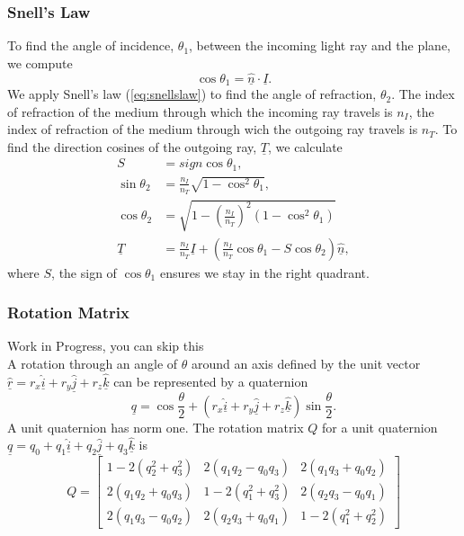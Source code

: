 \documentclass{article}
\begin{document}
\subsubsection{Snell's Law}
To find the angle of incidence, $\theta_1$, between the incoming light ray and the plane, we compute
\begin{equation}
	\cos \theta_1 = \underline{\hat{n}} \cdot \underline{I}.
\end{equation}
We apply Snell's law (\ref{eq:snellslaw}) to find the angle of refraction, $\theta_2$. The index of refraction of the medium through which the incoming ray travels is $n_I$, the index of refraction of the medium through wich the outgoing ray travels is $n_T$. To find the direction cosines of the outgoing ray, $\underline{T}$, we calculate 
\begin{align}
	S &= sign \cos \theta_1, \\
	\sin \theta_2 &= \frac{n_I}{n_T} \sqrt{1-\cos^2 \theta_1}, \\
	\cos \theta_2 &= \sqrt{1-\left(\frac{n_I}{n_T}\right)^2(1-\cos^2 \theta_1)} \\
	\underline{T} &= \frac{n_I}{n_T} \underline{I} + \left(\frac{n_I}{n_T} \cos \theta_1 - S \cos\theta_2\right)\underline{\hat{n}},	
\end{align}
where $S$, the sign of $\cos\theta_1$ ensures we stay in the right quadrant.

\subsubsection{Rotation Matrix}
\label{subsubsec:rotmat}
{\color{red} Work in Progress, you can skip this} \\
A rotation through an angle of $\theta$ around an axis defined by the unit vector $\underline{\hat{r}} = r_x \underline{\hat{i}} + r_y \underline{\hat{j}} + r_z \underline{\hat{k}}$ can be represented by a quaternion
\begin{equation}
	\underline{q} = \cos\frac{\theta}{2} + (r_x \underline{\hat{i}} + r_y \underline{\hat{j}} + r_z \underline{\hat{k}} ) \sin \frac{\theta}{2}.
\end{equation} 
A unit quaternion has norm one. The rotation matrix $Q$ for a unit quaternion $\underline{q} = q_0 + q_1 \underline{\hat{i}} + q_2 \underline{\hat{j}} + q_3 \underline{\hat{k}}$ is
\begin{equation}
	Q = \left[ \begin{array}{ccc} 1-2(q_2^2+q_3^2) & 2(q_1 q_2 - q_0 q_3) & 2(q_1 q_3 + q_0 q_2) \\ 2 (q_1 q_2 + q_0 q_3) & 1-2(q_1^2+q_3^2) & 2( q_2 q_3 - q_0 q_1) \\ 2(q_1 q_3-q_0 q_2) & 2 (q_2 q_3 + q_0 q_1) & 1 - 2 (q_1^2+q_2^2) \end{array} \right]
\end{equation}
\end{document}
